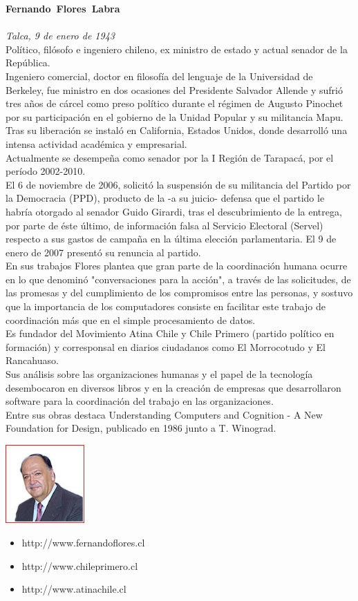 \textbf{Fernando\ Flores\ Labra}\\\\
\emph{Talca, 9 de enero de 1943}\\
Pol\'itico, fil\'osofo e ingeniero chileno, ex ministro de estado y actual senador de la Rep\'ublica.\\
Ingeniero comercial, doctor en filosof\'ia del lenguaje de la Universidad de Berkeley, fue ministro en dos
ocasiones del Presidente Salvador Allende y sufri\'o tres a\~nos de c\'arcel como preso pol\'itico durante
el r\'egimen de Augusto Pinochet por su participaci\'on en el gobierno de la Unidad Popular y su militancia Mapu.\\
Tras su liberaci\'on se instal\'o en California, Estados Unidos, donde desarroll\'o una intensa actividad acad\'emica
y empresarial.\\
Actualmente se desempe\~na como senador por la I Regi\'on de Tarapac\'a, por el período 2002-2010.\\
El 6 de noviembre de 2006, solicit\'o la suspensi\'on de su militancia del Partido por la Democracia (PPD), producto
de la -a su juicio- defensa que el partido le habr\'ia otorgado al senador Guido Girardi, tras el descubrimiento de la
entrega, por parte de \'este \'ultimo, de informaci\'on falsa al Servicio Electoral (Servel) respecto a sus gastos de
campa\~na en la \'ultima elecci\'on parlamentaria. El 9 de enero de 2007 present\'o su renuncia al partido.\\
En sus trabajos Flores plantea que gran parte de la coordinaci\'on humana ocurre en lo que denomin\'o "conversaciones
para la acci\'on", a trav\'es de las solicitudes, de las promesas y del cumplimiento de los compromisos entre las personas,
y sostuvo que la importancia de los computadores consiste en facilitar este trabajo de coordinaci\'on más que en el simple
procesamiento de datos.\\
Es fundador del Movimiento Atina Chile y Chile Primero (partido pol\'itico en formaci\'on) y corresponsal en diarios ciudadanos
como El Morrocotudo y El Rancahuaso.\\
Sus an\'alisis sobre las organizaciones humanas y el papel de la tecnolog\'ia desembocaron en diversos libros y en la creaci\'on
de empresas que desarrollaron software para la coordinaci\'on del trabajo en las organizaciones.\\
Entre sus obras destaca Understanding Computers and Cognition - A New Foundation for Design, publicado en 1986 junto a T. Winograd.\\
\begin{center}
\includegraphics[height=3cm]{images/flores}
\end{center}
\begin{itemize}
	\item http://www.fernandoflores.cl
	\item http://www.chileprimero.cl
	\item http://www.atinachile.cl
\end{itemize}
